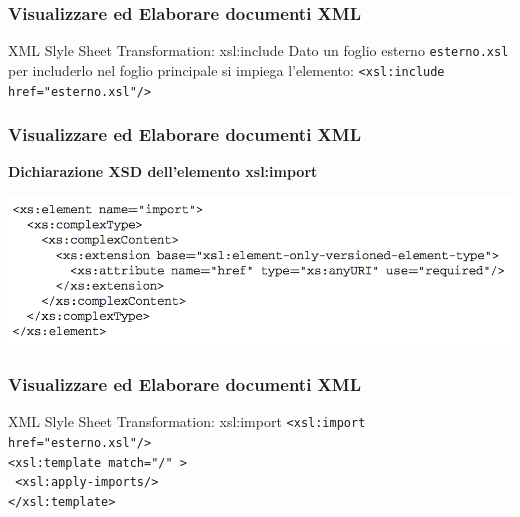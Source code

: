 \begin{frame}
    \frametitle{Visualizzare ed Elaborare documenti XML}
    \addtocounter{nframe}{1}
    

     \begin{block}{XML Slyle Sheet Transformation: xsl:include}
        Dato un foglio esterno \texttt{esterno.xsl} per includerlo nel foglio principale si impiega l'elemento: \texttt{<xsl:include href="esterno.xsl"/>}
     \end{block}

\end{frame}

\begin{frame}
    \frametitle{Visualizzare ed Elaborare documenti XML}
    \addtocounter{nframe}{1}
    
    \textbf{Dichiarazione XSD dell'elemento xsl:import}

    \begin{center}
        \includegraphics[width=.8\textwidth]{imgs/elementXSL-Import.png}
    \end{center}

\end{frame}

\begin{frame}
    \frametitle{Visualizzare ed Elaborare documenti XML}
    \addtocounter{nframe}{1}
    

     \begin{block}{XML Slyle Sheet Transformation: xsl:import}
        \texttt{<xsl:import href="esterno.xsl"/>}
        \\\texttt{<xsl:template match="/" >}
        \\\texttt{ <xsl:apply-imports/>}
        \\\texttt{</xsl:template>}
     \end{block}

\end{frame}


